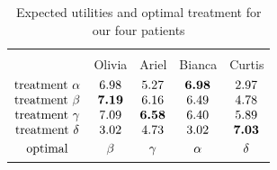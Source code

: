 \documentclass[utf8]{FrontiersinHarvard} %
\renewcommand*{\|}[1][]{\nonscript\:#1\vert\nonscript\:\mathopen{}}
\begin{document}
\medskip
\begin{table}[!h]
  \centering
  \begin{tabular}{lcccc}
    \hline\\[-1.5\jot]
    &{\small Olivia} &{\small Ariel} &{\small Bianca} &{\small Curtis}
    \\[\jot]
    $\begin{matrix}
      \text{treatment }\alpha\\ 
      \text{treatment }\beta\\ 
      \text{treatment }\gamma\\ 
      \text{treatment }\delta\\[\jot]
      \text{optimal}
    \end{matrix}$
    &
    $\begin{matrix}6.98\\\bm{7.19}\\7.09\\3.02\\[\jot]\beta\end{matrix}$
    &
    $\begin{matrix}5.27\\6.16\\\bm{6.58}\\4.73\\[\jot]\gamma\end{matrix}$
    &
    $\begin{matrix}\bm{6.98}\\6.49\\6.40\\3.02\\[\jot]\alpha\end{matrix}$
    &
    $\begin{matrix}2.97\\4.78\\5.89\\\bm{7.03}\\[\jot]\delta\end{matrix}$
    \\[5\jot]
    \hline
  \end{tabular}
  \caption{Expected utilities and optimal treatment for our four patients}\label{tab:exp_utilities_patients}
\end{table}


\end{document}
